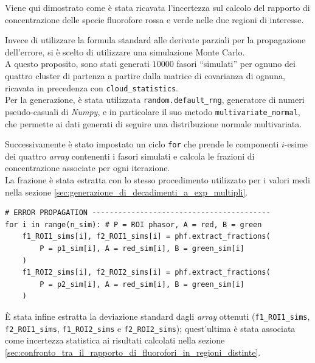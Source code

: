 Viene qui dimostrato come è stata ricavata l'incertezza sul calcolo del rapporto di concentrazione delle specie fluorofore rossa e verde nelle due regioni di interesse.

Invece di utilizzare la formula standard alle derivate parziali per la propagazione dell'errore, si è scelto di utilizzare una simulazione Monte Carlo.\\
A questo proposito, sono stati generati $10000$ fasori ``simulati'' per ognuno dei quattro cluster di partenza a partire dalla matrice di covarianza di ognuna, ricavata in precedenza con \texttt{cloud\_statistics}.\\
Per la generazione, è stata utilizzata \texttt{random.default\_rng}, generatore di numeri pseudo-casuali di \textit{Numpy}, e in particolare il suo metodo \texttt{multivariate\_normal}, che permette ai dati generati di seguire una distribuzione normale multivariata.

Successivamente è stato impostato un ciclo \texttt{for} che prende le componenti $i$-esime dei quattro \textit{array} contenenti i fasori simulati e calcola le frazioni di concentrazione associate per ogni iterazione.\\
La frazione è stata estratta con lo stesso procedimento utilizzato per i valori medi nella sezione \ref{sec:generazione_di_decadimenti_a_exp_multipli}.
\begin{verbatim}
# ERROR PROPAGATION -----------------------------------------
for i in range(n_sim): # P = ROI phasor, A = red, B = green
    f1_ROI1_sims[i], f2_ROI1_sims[i] = phf.extract_fractions(
        P = p1_sim[i], A = red_sim[i], B = green_sim[i]
    )
    f1_ROI2_sims[i], f2_ROI2_sims[i] = phf.extract_fractions(
        P = p2_sim[i], A = red_sim[i], B = green_sim[i]
    )
\end{verbatim}
È stata infine estratta la deviazione standard dagli \textit{array} ottenuti (\texttt{f1\_ROI1\_sims}, \texttt{f2\_ROI1\_sims}, \texttt{f1\_ROI2\_sims} e \texttt{f2\_ROI2\_sims}); quest'ultima è stata associata come incertezza statistica ai risultati calcolati nella sezione \ref{sec:confronto_tra_il_rapporto_di_fluorofori_in_regioni_distinte}.
